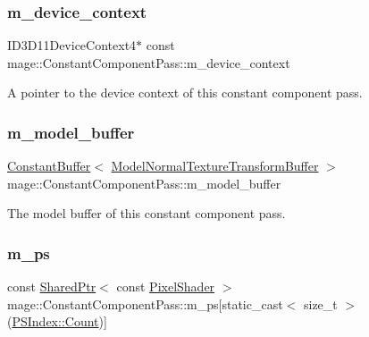 \subsubsection{\texorpdfstring{m\+\_\+device\+\_\+context}{m\_device\_context}}
{\footnotesize\ttfamily I\+D3\+D11\+Device\+Context4$\ast$ const mage\+::\+Constant\+Component\+Pass\+::m\+\_\+device\+\_\+context\hspace{0.3cm}{\ttfamily [private]}}

A pointer to the device context of this constant component pass. \hypertarget{classmage_1_1_constant_component_pass_a012197b5473955c356d2fbc48f9d3e8b}{}\label{classmage_1_1_constant_component_pass_a012197b5473955c356d2fbc48f9d3e8b} 
\subsubsection{\texorpdfstring{m\+\_\+model\+\_\+buffer}{m\_model\_buffer}}
{\footnotesize\ttfamily \hyperlink{classmage_1_1_constant_buffer}{Constant\+Buffer}$<$ \hyperlink{structmage_1_1_model_normal_texture_transform_buffer}{Model\+Normal\+Texture\+Transform\+Buffer} $>$ mage\+::\+Constant\+Component\+Pass\+::m\+\_\+model\+\_\+buffer\hspace{0.3cm}{\ttfamily [private]}}

The model buffer of this constant component pass. \hypertarget{classmage_1_1_constant_component_pass_a932366be8feba629aa2dd29a844e38b8}{}\label{classmage_1_1_constant_component_pass_a932366be8feba629aa2dd29a844e38b8} 
\subsubsection{\texorpdfstring{m\+\_\+ps}{m\_ps}}
{\footnotesize\ttfamily const \hyperlink{namespacemage_a1e01ae66713838a7a67d30e44c67703e}{Shared\+Ptr}$<$ const \hyperlink{namespacemage_a27ecaf266420ee7a494d64edc0757129}{Pixel\+Shader} $>$ mage\+::\+Constant\+Component\+Pass\+::m\+\_\+ps\mbox{[}static\+\_\+cast$<$ size\+\_\+t $>$(\hyperlink{classmage_1_1_constant_component_pass_abad8858867cb29081767f13ba6cdb366ae93f994f01c537c4e2f7d8528c3eb5e9}{P\+S\+Index\+::\+Count})\mbox{]}\hspace{0.3cm}{\ttfamily [private]}}

